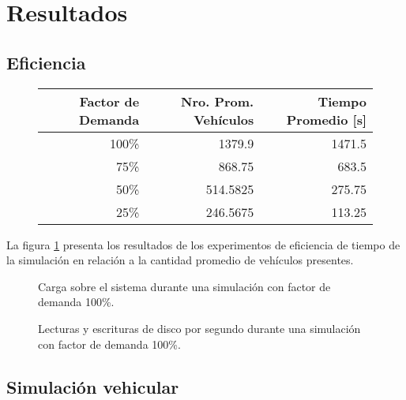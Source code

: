 \section{Resultados}\label{sec:results}
\subsection{Eficiencia}

\begin{figure}[htpb]
    \centering
    \begin{tabular}{@{}rrr@{}}
        \textbf{Factor de Demanda} & \textbf{Nro. Prom. Vehículos} & \textbf{Tiempo Promedio [s]} \\ \midrule
        100\%           & 1379.9          & 1471.5              \\ %
        75\%            & 868.75          & 683.5               \\ %
        50\%            & 514.5825        & 275.75              \\ %
        25\%            & 246.5675        & 113.25              \\ \bottomrule
    \end{tabular}
    \label{table:vehiclesvstime}


    
    \label{fig:vehiclesvstime}
\end{figure}

La figura \ref{fig:vehiclesvstime} presenta los resultados de los experimentos de eficiencia de tiempo de la simulación en relación a la cantidad promedio de vehículos presentes.

\begin{figure}[tpb]
    \centering
    
    \caption{Carga sobre el sistema durante una simulación con factor de demanda 100\%.}
    \label{fig:systemload:cpuram}
\end{figure}
\begin{figure}[tpb]
    \centering
    
    \caption{Lecturas y escrituras de disco por segundo durante una simulación con factor de demanda 100\%.}
    \label{fig:systemload:io}
\end{figure} 


\subsection{Simulación vehicular}